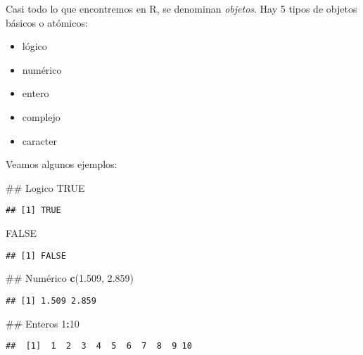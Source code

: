 \documentclass[spanish,]{book}
\newenvironment{Shaded}{\begin{snugshade}}{\end{snugshade}}
\newcommand{\KeywordTok}[1]{\textcolor[rgb]{0.13,0.29,0.53}{\textbf{#1}}}
\newcommand{\DecValTok}[1]{\textcolor[rgb]{0.00,0.00,0.81}{#1}}
\newcommand{\FloatTok}[1]{\textcolor[rgb]{0.00,0.00,0.81}{#1}}
\newcommand{\OtherTok}[1]{\textcolor[rgb]{0.56,0.35,0.01}{#1}}
\newcommand{\OperatorTok}[1]{\textcolor[rgb]{0.81,0.36,0.00}{\textbf{#1}}}
\newcommand{\NormalTok}[1]{#1}
\providecommand{\tightlist}{%
  \setlength{\itemsep}{0pt}\setlength{\parskip}{0pt}}
\begin{document}
Casi todo lo que encontremos en R, se denominan \emph{objetos}. Hay 5
tipos de objetos básicos o atómicos:

\begin{itemize}
\tightlist
\item
  lógico
\item
  numérico
\item
  entero
\item
  complejo
\item
  caracter
\end{itemize}

Veamos algunos ejemplos:

\begin{Shaded}
\begin{Highlighting}[]
\NormalTok{## Logico}
\OtherTok{TRUE}
\end{Highlighting}
\end{Shaded}

\begin{verbatim}
## [1] TRUE
\end{verbatim}

\begin{Shaded}
\begin{Highlighting}[]
\OtherTok{FALSE}
\end{Highlighting}
\end{Shaded}

\begin{verbatim}
## [1] FALSE
\end{verbatim}

\begin{Shaded}
\begin{Highlighting}[]
\NormalTok{## Numérico}
\KeywordTok{c}\NormalTok{(}\FloatTok{1.509}\NormalTok{, }\FloatTok{2.859}\NormalTok{)}
\end{Highlighting}
\end{Shaded}

\begin{verbatim}
## [1] 1.509 2.859
\end{verbatim}

\begin{Shaded}
\begin{Highlighting}[]
\NormalTok{## Enteros}
\DecValTok{1}\OperatorTok{:}\DecValTok{10}
\end{Highlighting}
\end{Shaded}

\begin{verbatim}
##  [1]  1  2  3  4  5  6  7  8  9 10
\end{verbatim}
\end{document}
